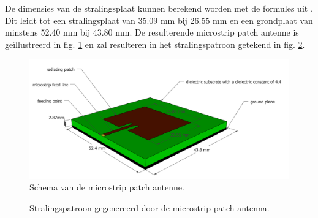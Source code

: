 \documentclass[twocolumn]{phdsymp_dutch}
\begin{document}
De dimensies van de stralingsplaat kunnen berekend worden met de formules uit \cite{J14_antennadesign,J15_antennadesign}.
Dit leidt tot een stralingsplaat van 35.09 mm bij 26.55 mm en  een grondplaat van minstens 52.40 mm bij 43.80 mm.
De resulterende microstrip patch antenne is ge\"illustreerd in fig. \ref{fig:basicpatchantenna} en zal resulteren 
in het stralingspatroon getekend in fig. \ref{fig:radpattern}.
\vspace{ 6.4 mm}
\begin{figure}[h!]
\centering
  \includegraphics[width=\linewidth]{MicrostripAntenna.png}
  \caption{Schema van de microstrip patch antenne.}
  \label{fig:basicpatchantenna}
\end{figure}

\begin{figure}[!htb]
\hfill
{}
  \caption{Stralingspatroon gegenereerd door de microstrip patch antenna.}
\label{fig:radpattern}
\end{figure}
\end{document}
